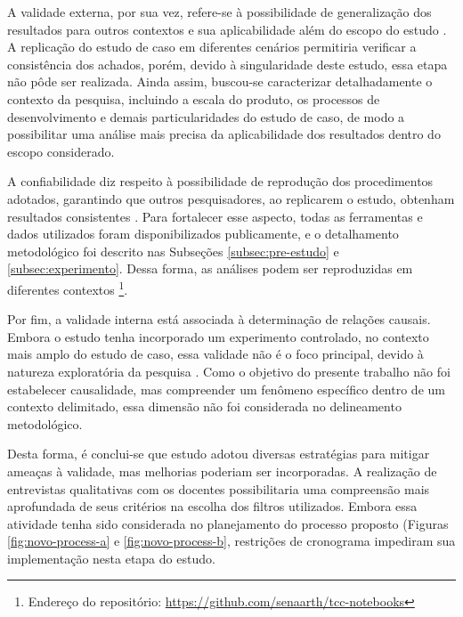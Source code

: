 
A validade externa, por sua vez, refere-se à possibilidade de generalização dos resultados para outros contextos e sua aplicabilidade além do escopo do estudo \cite{yin_case_study_2009}. A replicação do estudo de caso em diferentes cenários permitiria verificar a consistência dos achados, porém, devido à singularidade deste estudo, essa etapa não pôde ser realizada. Ainda assim, buscou-se caracterizar detalhadamente o contexto da pesquisa, incluindo a escala do produto, os processos de desenvolvimento e demais particularidades do estudo de caso, de modo a possibilitar uma análise mais precisa da aplicabilidade dos resultados dentro do escopo considerado.

A confiabilidade diz respeito à possibilidade de reprodução dos procedimentos adotados, garantindo que outros pesquisadores, ao replicarem o estudo, obtenham resultados consistentes \cite{wohlin_experimentation_2012}. Para fortalecer esse aspecto, todas as ferramentas e dados utilizados foram disponibilizados publicamente, e o detalhamento metodológico foi descrito nas Subseções \ref{subsec:pre-estudo} e \ref{subsec:experimento}. Dessa forma, as análises podem ser reproduzidas em diferentes contextos \footnote{Endereço do repositório: \href{https://github.com/senaarth/tcc-notebooks/blob/main/experiment.ipynb}{https://github.com/senaarth/tcc-notebooks}}.

Por fim, a validade interna está associada à determinação de relações causais. Embora o estudo tenha incorporado um experimento controlado, no contexto mais amplo do estudo de caso, essa validade não é o foco principal, devido à natureza exploratória da pesquisa \cite{yin_case_study_2009}. Como o objetivo do presente trabalho não foi estabelecer causalidade, mas compreender um fenômeno específico dentro de um contexto delimitado, essa dimensão não foi considerada no delineamento metodológico.

Desta forma, é conclui-se que estudo adotou diversas estratégias para mitigar ameaças à validade, mas melhorias poderiam ser incorporadas. A realização de entrevistas qualitativas com os docentes possibilitaria uma compreensão mais aprofundada de seus critérios na escolha dos filtros utilizados. Embora essa atividade tenha sido considerada no planejamento do processo proposto (Figuras \ref{fig:novo-process-a} e \ref{fig:novo-process-b}, restrições de cronograma impediram sua implementação nesta etapa do estudo.